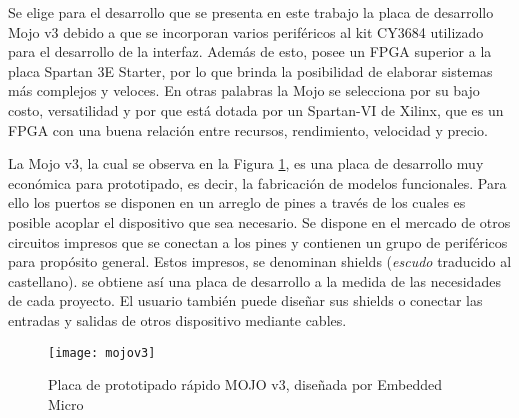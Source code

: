 Se elige para el desarrollo que se presenta en este trabajo la placa de desarrollo Mojo v3 debido a que se incorporan varios periféricos al kit CY3684 utilizado para el desarrollo de la interfaz. Además de esto, posee un FPGA superior a la placa Spartan 3E Starter, por lo que brinda la posibilidad de elaborar sistemas más complejos y veloces. En otras palabras la Mojo se selecciona por su bajo costo, versatilidad y por que está dotada por un Spartan-VI de Xilinx, que es un FPGA con una buena relación entre recursos, rendimiento, velocidad y precio.
%


La Mojo v3, la cual se observa en la Figura \ref{mojo}, es una placa de desarrollo muy económica para prototipado, es decir, la fabricación de modelos funcionales. Para ello los puertos se disponen en un arreglo de pines a través de los cuales es posible acoplar el dispositivo que sea necesario. Se dispone en el mercado de otros circuitos impresos que se conectan a los pines y contienen un grupo de periféricos para propósito general. Estos impresos, se denominan shields ({\it escudo} traducido al castellano). se obtiene así una placa de desarrollo a la medida de las necesidades de cada proyecto. El usuario también puede diseñar sus shields o conectar las entradas y salidas de otros dispositivo mediante cables.%

\begin{figure}[ht]
	\centering
	\texttt{[image: mojov3]}
	\caption{Placa de prototipado rápido MOJO v3, diseñada por Embedded Micro}
	\label{mojo}
\end{figure}

